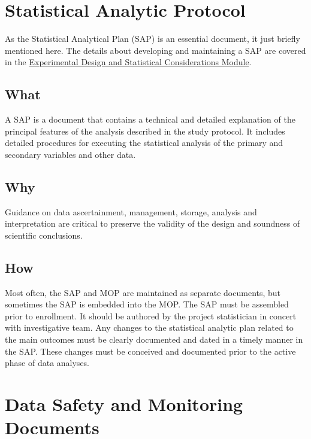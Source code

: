 \documentclass[]{book}
\theoremstyle{definition}
\theoremstyle{definition}
\theoremstyle{definition}
\theoremstyle{remark}
\begin{document}
\section{Statistical Analytic
Protocol}\label{statistical-analytic-protocol}

As the Statistical Analytical Plan (SAP) is an essential document, it
just briefly mentioned here. The details about developing and
maintaining a SAP are covered in the
\href{https://ifar-isac.github.io/book/experimental-design-and-statistical-considerations.html}{Experimental
Design and Statistical Considerations Module}.

\subsection{What}\label{what-13}

A SAP is a document that contains a technical and detailed explanation
of the principal features of the analysis described in the study
protocol. It includes detailed procedures for executing the statistical
analysis of the primary and secondary variables and other data.

\subsection{Why}\label{why-13}

Guidance on data ascertainment, management, storage, analysis and
interpretation are critical to preserve the validity of the design and
soundness of scientific conclusions.

\subsection{How}\label{how-13}

Most often, the SAP and MOP are maintained as separate documents, but
sometimes the SAP is embedded into the MOP. The SAP must be assembled
prior to enrollment. It should be authored by the project statistician
in concert with investigative team. Any changes to the statistical
analytic plan related to the main outcomes must be clearly documented
and dated in a timely manner in the SAP. These changes must be conceived
and documented prior to the active phase of data analyses.

\section{Data Safety and Monitoring
Documents}\label{data-safety-and-monitoring-documents}
\end{document}
